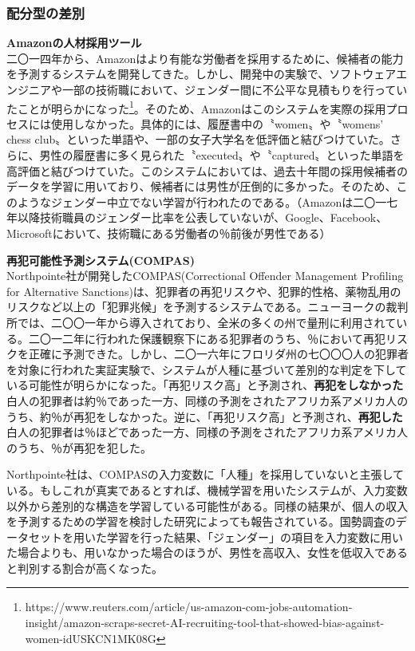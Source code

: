 \documentclass[b5j,twoside,twocolumn]{utarticle}
\begin{document}
\subsubsection*{配分型の差別}
\textbf{Amazonの人材採用ツール}\\
二〇一四年から、Amazonはより有能な労働者を採用するために、候補者の能力を予測するシステムを開発してきた。しかし、開発中の実験で、ソフトウェアエンジニアや一部の技術職において、ジェンダー間に不公平な見積もりを行っていたことが明らかになった\footnote{https://www.reuters.com/article/us-amazon-com-jobs-automation-insight/amazon-scraps-secret-AI-recruiting-tool-that-showed-bias-against-women-idUSKCN1MK08G}。そのため、Amazonはこのシステムを実際の採用プロセスには使用しなかった。具体的には、履歴書中の〝women〟や〝womens' chess club〟といった単語や、一部の女子大学名を低評価と結びつけていた。さらに、男性の履歴書に多く見られた〝executed〟や〝captured〟といった単語を高評価と結びつけていた。このシステムにおいては、過去十年間の採用候補者のデータを学習に用いており、候補者には男性が圧倒的に多かった。そのため、このようなジェンダー中立でない学習が行われたのである。（Amazonは二〇一七年以降技術職員のジェンダー比率を公表していないが、Google、Facebook、Microsoftにおいて、技術職にある労働者の％前後が男性である）


\textbf{再犯可能性予測システム(COMPAS)}\\
Northpointe社が開発したCOMPAS(Correctional Offender Management Profiling for Alternative Sanctions)は、犯罪者の再犯リスクや、犯罪的性格、薬物乱用のリスクなど以上の「犯罪兆候」を予測するシステムである。ニューヨークの裁判所では、二〇〇一年から導入されており、全米の多くの州で量刑に利用されている。二〇一二年に行われた保護観察下にある犯罪者のうち、％において再犯リスクを正確に予測できた。しかし、二〇一六年にフロリダ州の七〇〇〇人の犯罪者を対象に行われた実証実験\cite{compas}で、システムが人種に基づいて差別的な判定を下している可能性が明らかになった。「再犯リスク高」と予測され、\textbf{再犯をしなかった}白人の犯罪者は約％であった一方、同様の予測をされたアフリカ系アメリカ人のうち、約％が再犯をしなかった。逆に、「再犯リスク高」と予測され、\textbf{再犯した}白人の犯罪者は％ほどであった一方、同様の予測をされたアフリカ系アメリカ人のうち、％が再犯を犯した。

Northpointe社は、COMPASの入力変数に「人種」を採用していないと主張している。もしこれが真実であるとすれば、機械学習を用いたシステムが、入力変数以外から差別的な構造を学習している可能性がある。同様の結果が、個人の収入を予測するための学習を検討した研究によっても報告されている。国勢調査のデータセットを用いた学習を行った結果、「ジェンダー」の項目を入力変数に用いた場合よりも、用いなかった場合のほうが、男性を高収入、女性を低収入であると判別する割合が高くなった\cite{Calders2010}。
\end{document}
